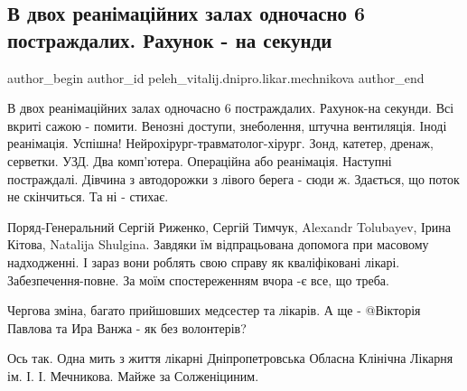  
 
 
 
 

\subsection{В двох реанімаційних залах одночасно 6 постраждалих. Рахунок - на секунди}
\label{sec:15_01_2023.fb.peleh_vitalij.dnipro.likar.mechnikova.1.v_dvokh_rean_mats_in}

\ifcmt
 author_begin
   author_id peleh_vitalij.dnipro.likar.mechnikova
 author_end
\fi

В двох реанімаційних залах одночасно 6 постраждалих. Рахунок-на секунди. Всі
вкриті сажою - помити. Венозні доступи, знеболення, штучна вентиляція. Іноді
реанімація. Успішна! Нейрохірург-травматолог-хірург. Зонд, катетер, дренаж,
серветки. УЗД. Два комп'ютера. Операційна або реанімація. Наступні постраждалі.
Дівчина з автодорожки з лівого берега - сюди ж. Здається, що поток не
скінчиться. Та ні - стихає.

Поряд-Генеральний Сергій Риженко, Сергій Тимчук, Alexandr Tolubayev, Ірина
Кітова, Natalija  Shulgina. Завдяки їм відпрацьована допомога при масовому
надходженні. І зараз вони роблять свою справу як кваліфіковані лікарі.
Забезпечення-повне. За моїм спостереженням вчора -є все, що треба.

Чергова зміна, багато прийшовших медсестер та лікарів. А ще - @Вікторія Павлова
та Ира Ванжа - як без волонтерів?

Ось так. Одна мить з життя лікарні Дніпропетровська Обласна Клінічна Лікарня
ім. І. І. Мечникова. Майже за Солженіциним.
